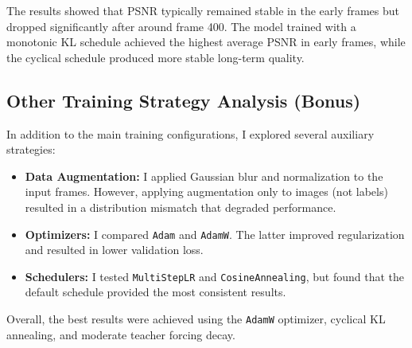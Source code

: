 The results showed that PSNR typically remained stable in the early frames but dropped significantly after around frame 400. The model trained with a monotonic KL schedule achieved the highest average PSNR in early frames, while the cyclical schedule produced more stable long-term quality.

\subsection{Other Training Strategy Analysis (Bonus)}

In addition to the main training configurations, I explored several auxiliary strategies:

\begin{itemize}
    \item \textbf{Data Augmentation:} I applied Gaussian blur and normalization to the input frames. However, applying augmentation only to images (not labels) resulted in a distribution mismatch that degraded performance.
    \item \textbf{Optimizers:} I compared \texttt{Adam} and \texttt{AdamW}. The latter improved regularization and resulted in lower validation loss.
    \item \textbf{Schedulers:} I tested \texttt{MultiStepLR} and \texttt{CosineAnnealing}, but found that the default schedule provided the most consistent results.
\end{itemize}

Overall, the best results were achieved using the \texttt{AdamW} optimizer, cyclical KL annealing, and moderate teacher forcing decay.
